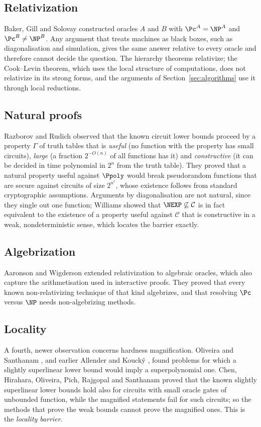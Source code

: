 \subsection{Relativization}
Baker, Gill and Solovay \cite{BGS75} constructed oracles $A$ and $B$ with
$\Pc^A=\NP^A$ and $\Pc^B\ne\NP^B$. Any argument that treats machines as black
boxes, such as diagonalisation and simulation, gives the same answer relative
to every oracle and therefore cannot decide the question. The hierarchy
theorems relativize; the Cook--Levin theorem, which uses the local structure of
computations, does not relativize in its strong forms, and the arguments of
Section~\ref{sec:algorithms} use it through local reductions.

\subsection{Natural proofs}
Razborov and Rudich \cite{RR97} observed that the known circuit lower bounds
proceed by a property $\Gamma$ of truth tables that is \emph{useful} (no
function with the property has small circuits), \emph{large} (a fraction
$2^{-O(n)}$ of all functions has it) and \emph{constructive} (it can be
decided in time polynomial in $2^n$ from the truth table). They proved that a
natural property useful against $\Ppoly$ would break pseudorandom functions
that are secure against circuits of size $2^{n^\epsilon}$, whose existence
follows from standard cryptographic assumptions. Arguments by diagonalisation
are not natural, since they single out one function; Williams \cite{Wil16}
showed that $\NEXP\not\subseteq\mathcal C$ is in fact equivalent to the
existence of a property useful against $\mathcal C$ that is constructive in a
weak, nondeterministic sense, which locates the barrier exactly.

\subsection{Algebrization}
Aaronson and Wigderson \cite{AW09} extended relativization to algebraic
oracles, which also capture the arithmetisation used in interactive proofs.
They proved that every known non-relativizing technique of that kind
algebrizes, and that resolving $\Pc$ versus $\NP$ needs non-algebrizing
methods.

\subsection{Locality}
A fourth, newer observation concerns hardness magnification. Oliveira and
Santhanam \cite{OS18}, and earlier Allender and Kouck\'y \cite{AK10}, found
problems for which a slightly superlinear lower bound would imply a
superpolynomial one. Chen, Hirahara, Oliveira, Pich, Rajgopal and Santhanam
\cite{CHOPRS22} proved that the known slightly superlinear lower bounds hold
also for circuits with small oracle gates of unbounded function, while the
magnified statements fail for such circuits; so the methods that prove the weak
bounds cannot prove the magnified ones. This is the \emph{locality barrier}.

